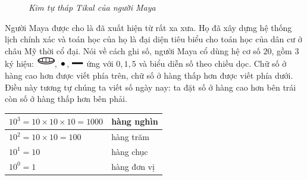 \begin{multicols}{2}
\begin{figure}[H]
		\caption{\textit{\color{toancuabi}Kim tự tháp Tikal của người Maya}}
		\vspace*{-15pt}
	\end{figure}
	Người Maya  được cho là đã xuất hiện từ rất xa xưa. Họ đã xây dựng hệ thống lịch chính xác và toán học của họ là đại diện tiêu biểu cho toán học của dân cư ở châu Mỹ thời cổ đại.
	\vskip 0.1cm
	Nói về cách ghi số,  người Maya  cổ dùng hệ cơ số $20$, gồm $3$ ký hiệu:  \includegraphics[scale=0.7]{29},  \includegraphics[scale=0.7]{30}, \includegraphics[scale=0.7]{31}  ứng với $0,1, 5$ và biểu diễn số theo chiều dọc. Chữ số ở hàng cao hơn được viết phía trên, chữ số ở hàng thấp hơn được viết phía dưới. Điều này tương tự chúng ta viết số ngày nay: ta đặt số ở hàng cao hơn bên trái còn số ở hàng thấp hơn bên phải. 
	\begin{table}[H]
		\vspace*{-5pt}
		\centering
		\setlength{\tabcolsep}{4.5pt}
		\renewcommand{\arraystretch}{1.25}
		\begin{tabular}{|l|l|}
			\hline
			$10^3 = 10\!\times\! 10 \!\times\! 10 =1000$& hàng nghìn\\
			\hline
			$10^2 = 10\!\times\! 10 =100$& hàng trăm\\
			\hline
			$10^1 = 10$& hàng chục\\
			\hline
			$10^0 = 1$& hàng đơn vị\\
			\hline
		\end{tabular}
	\end{table}

\end{multicols}
